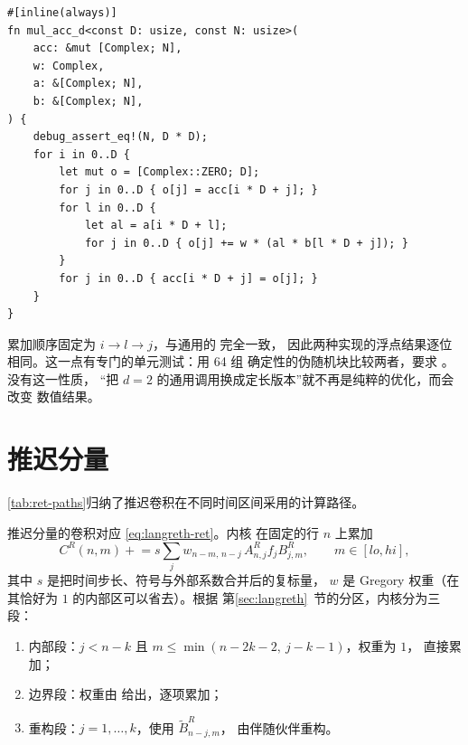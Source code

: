 \begin{lstlisting}[caption={固定维数块乘法},label={lst:mulaccd}]
#[inline(always)]
fn mul_acc_d<const D: usize, const N: usize>(
    acc: &mut [Complex; N],
    w: Complex,
    a: &[Complex; N],
    b: &[Complex; N],
) {
    debug_assert_eq!(N, D * D);
    for i in 0..D {
        let mut o = [Complex::ZERO; D];
        for j in 0..D { o[j] = acc[i * D + j]; }
        for l in 0..D {
            let al = a[i * D + l];
            for j in 0..D { o[j] += w * (al * b[l * D + j]); }
        }
        for j in 0..D { acc[i * D + j] = o[j]; }
    }
}
\end{lstlisting}

累加顺序固定为 $i\to l\to j$，与通用的  完全一致，
因此两种实现的浮点结果逐位相同。这一点有专门的单元测试：用 64 组
确定性的伪随机块比较两者，要求 。没有这一性质，
“把 $d=2$ 的通用调用换成定长版本”就不再是纯粹的优化，而会改变
数值结果。

\section{推迟分量}
\label{sec:ret-kernel}

\cref{tab:ret-paths}归纳了推迟卷积在不同时间区间采用的计算路径。

推迟分量的卷积对应 \cref{eq:langreth-ret}。内核
 在固定的行 $n$ 上累加
\begin{equation}
    C^{R}(n,m) \mathrel{+}= s\sum_{j}w_{n-m,\,n-j}\,
        A^{R}_{n,j}f_j B^{R}_{j,m},
    \qquad m\in[lo,hi],
\end{equation}
其中 $s$ 是把时间步长、符号与外部系数合并后的复标量，
$w$ 是 Gregory 权重（在其恰好为 $1$ 的内部区可以省去）。根据
第\ref{sec:langreth}~节的分区，内核分为三段：
\begin{enumerate}[label=(\arabic*)]
    \item 内部段：$j<n-k$ 且 $m\le\min(n-2k-2,\ j-k-1)$，权重为 $1$，
          直接累加；
    \item 边界段：权重由  给出，逐项累加；
    \item 重构段：$j=1,\dots,k$，使用 $\tilde{B}^{R}_{n-j,m}$，
          由伴随伙伴重构。
\end{enumerate}


